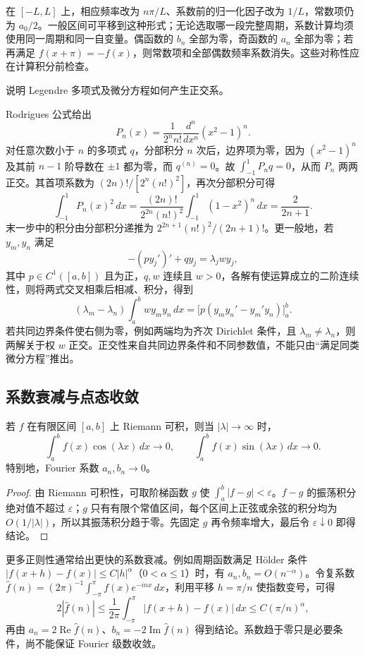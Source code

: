 在 $[-L,L]$ 上，相应频率改为 $n\pi/L$、系数前的归一化因子改为 $1/L$，常数项仍为 $a_0/2$。一般区间可平移到这种形式；无论选取哪一段完整周期，系数计算均须使用同一周期和同一自变量。偶函数的 $b_n$ 全部为零，奇函数的 $a_n$ 全部为零；若再满足 $f(x+\pi)=-f(x)$，则常数项和全部偶数频率系数消失。这些对称性应在计算积分前检查。

\begin{example}
说明 Legendre 多项式及微分方程如何产生正交系。
\end{example}
\begin{solve}
Rodrigues 公式给出
\[
 P_n(x)=\frac1{2^nn!}\frac{d^n}{dx^n}(x^2-1)^n.
\]
对任意次数小于 $n$ 的多项式 $q$，分部积分 $n$ 次后，边界项为零，因为 $(x^2-1)^n$ 及其前 $n-1$ 阶导数在 $\pm1$ 都为零，而 $q^{(n)}=0$。故 $\int_{-1}^{1}P_nq=0$，从而 $P_n$ 两两正交。其首项系数为 $(2n)!/[2^n(n!)^2]$，再次分部积分可得
\[
 \int_{-1}^{1}P_n(x)^2\,dx
 =\frac{(2n)!}{2^{2n}(n!)^2}\int_{-1}^{1}(1-x^2)^n\,dx
 =\frac2{2n+1}.
\]
末一步中的积分由分部积分递推为 $2^{2n+1}(n!)^2/(2n+1)!$。更一般地，若 $y_m,y_n$ 满足
\[
 -(p y_j')'+q y_j=\lambda_jw y_j,
\]
其中 $p\in C^1([a,b])$ 且为正，$q,w$ 连续且 $w>0$，各解有使运算成立的二阶连续性，则将两式交叉相乘后相减、积分，得到
\[
 (\lambda_m-\lambda_n)\int_a^bw y_my_n\,dx
 =\bigl[p(y_my_n'-y_m'y_n)\bigr]_a^b.
\]
若共同边界条件使右侧为零，例如两端均为齐次 Dirichlet 条件，且 $\lambda_m\ne\lambda_n$，则两解关于权 $w$ 正交。正交性来自共同边界条件和不同参数值，不能只由“满足同类微分方程”推出。
\end{solve}

\subsection{系数衰减与点态收敛}

\begin{lemma}
若 $f$ 在有限区间 $[a,b]$ 上 Riemann 可积，则当 $|\lambda|\to\infty$ 时，
\[
 \int_a^bf(x)\cos(\lambda x)\,dx\longrightarrow0,\qquad
 \int_a^bf(x)\sin(\lambda x)\,dx\longrightarrow0.
\]
特别地，Fourier 系数 $a_n,b_n\to0$。
\end{lemma}
\begin{proof}
由 Riemann 可积性，可取阶梯函数 $g$ 使 $\int_a^b|f-g|<\varepsilon$。$f-g$ 的振荡积分绝对值不超过 $\varepsilon$；$g$ 只有有限个常值区间，每个区间上正弦或余弦的积分均为 $O(1/|\lambda|)$，所以其振荡积分趋于零。先固定 $g$ 再令频率增大，最后令 $\varepsilon\downarrow0$ 即得结论。
\end{proof}

更多正则性通常给出更快的系数衰减。例如周期函数满足 Hölder 条件 $|f(x+h)-f(x)|\leq C|h|^\alpha$（$0<\alpha\leq1$）时，有 $a_n,b_n=O(n^{-\alpha})$。令复系数 $\widehat f(n)=(2\pi)^{-1}\int_{-\pi}^{\pi}f(x)e^{-inx}\,dx$，利用平移 $h=\pi/n$ 使指数变号，可得
\[
 2|\widehat f(n)|\leq\frac1{2\pi}\int_{-\pi}^{\pi}|f(x+h)-f(x)|\,dx
 \leq C(\pi/n)^\alpha,
\]
再由 $a_n=2\operatorname{Re}\widehat f(n)$、$b_n=-2\operatorname{Im}\widehat f(n)$ 得到结论。系数趋于零只是必要条件，尚不能保证 Fourier 级数收敛。


